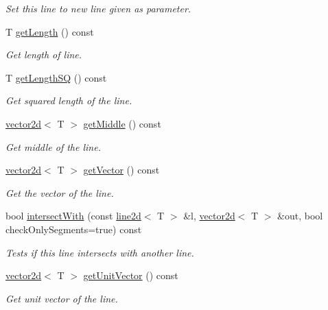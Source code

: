 \begin{DoxyCompactItemize}
\begin{DoxyCompactList}\small\item\em Set this line to new line given as parameter. \end{DoxyCompactList}\item 
T \hyperlink{classirr_1_1core_1_1line2d_a2eb306d0e3db94712ece741bfadbfa55}{get\+Length} () const 
\begin{DoxyCompactList}\small\item\em Get length of line. \end{DoxyCompactList}\item 
T \hyperlink{classirr_1_1core_1_1line2d_abd4c50d417c8d91401ff4bc59902ab35}{get\+Length\+SQ} () const 
\begin{DoxyCompactList}\small\item\em Get squared length of the line. \end{DoxyCompactList}\item 
\hyperlink{classirr_1_1core_1_1vector2d}{vector2d}$<$ T $>$ \hyperlink{classirr_1_1core_1_1line2d_a83b583161e402d93a2346a2dfbbd885c}{get\+Middle} () const 
\begin{DoxyCompactList}\small\item\em Get middle of the line. \end{DoxyCompactList}\item 
\hyperlink{classirr_1_1core_1_1vector2d}{vector2d}$<$ T $>$ \hyperlink{classirr_1_1core_1_1line2d_af6df3035ac8f217f86106ea88cc2e941}{get\+Vector} () const 
\begin{DoxyCompactList}\small\item\em Get the vector of the line. \end{DoxyCompactList}\item 
bool \hyperlink{classirr_1_1core_1_1line2d_a3ebdfe2b5dd3de6da61d7cb3030662e8}{intersect\+With} (const \hyperlink{classirr_1_1core_1_1line2d}{line2d}$<$ T $>$ \&l, \hyperlink{classirr_1_1core_1_1vector2d}{vector2d}$<$ T $>$ \&out, bool check\+Only\+Segments=true) const 
\begin{DoxyCompactList}\small\item\em Tests if this line intersects with another line. \end{DoxyCompactList}\item 
\hyperlink{classirr_1_1core_1_1vector2d}{vector2d}$<$ T $>$ \hyperlink{classirr_1_1core_1_1line2d_aa504bac64b0ccd56786d6179809ecdd9}{get\+Unit\+Vector} () const 
\begin{DoxyCompactList}\small\item\em Get unit vector of the line. \end{DoxyCompactList}\item 

\end{DoxyCompactItemize}

